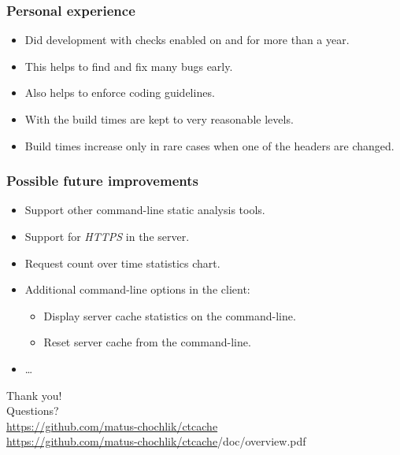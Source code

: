 \documentclass[compress,table,xcolor=table]{beamer}
\begin{document}
\begin{frame}
  \frametitle{Personal experience}
    \Large
    \begin{itemize}
    \item Did development with  checks enabled on
         and  for more than a year.
    \item This helps to find and fix many bugs early.
    \item Also helps to enforce coding guidelines.
    \item With  the build times are kept
        to very reasonable levels.
    \item Build times increase only in rare cases when one of the 
        headers are changed.
    \end{itemize}
\end{frame}
\begin{frame}
  \frametitle{Possible future improvements}
    \LARGE
    \begin{itemize}
    \item Support other command-line static analysis tools.
    \item Support for {\em HTTPS} in the server.
    \item Request count over time statistics chart.
    \item Additional command-line options in the client:
    \begin{itemize}
    \item Display server cache statistics on the command-line.
    \item Reset server cache from the command-line.
    \end{itemize}
    \item \ldots
    \end{itemize}
\end{frame}
\begin{frame}
  \centering
  \Huge
  Thank you!\\Questions?\\
  \vfill
  \Large
  \url{https://github.com/matus-chochlik/ctcache}\\
  \vfill
  \large
  \url{https://github.com/matus-chochlik/ctcache}/doc/overview.pdf
\end{frame}
\end{document}
